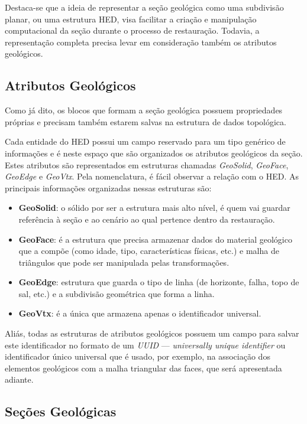 Destaca-se que a ideia de representar a seção geológica como uma subdivisão planar, ou uma estrutura HED, visa facilitar a criação e manipulação computacional da seção durante o processo de restauração. Todavia, a representação completa precisa levar em consideração também os atributos geológicos.

\subsection{Atributos Geológicos}

Como já dito, os blocos que formam a seção geológica possuem propriedades próprias e precisam também estarem salvas na estrutura de dados topológica.

Cada entidade do HED possui um campo reservado para um tipo genérico de informações e é neste espaço que são organizados os atributos geológicos da seção. Estes atributos são representados em estruturas chamadas \textit{GeoSolid}, \textit{GeoFace}, \textit{GeoEdge} e \textit{GeoVtx}. Pela nomenclatura, é fácil observar a relação com o HED. As principais informações organizadas nessas estruturas são:

\renewcommand{\labelitemi}{•}
\begin{itemize}
  \item \textbf{GeoSolid}: o sólido por ser a estrutura mais alto nível, é quem vai guardar referência à seção e ao cenário ao qual pertence dentro da restauração.
  \item \textbf{GeoFace}: é a estrutura que precisa armazenar dados do material geológico que a compõe (como idade, tipo, características físicas, etc.) e malha de triângulos que pode ser manipulada pelas transformações.
  \item \textbf{GeoEdge}: estrutura que guarda o tipo de linha (de horizonte, falha, topo de sal, etc.) e a subdivisão geométrica que forma a linha. 
  \item \textbf{GeoVtx}: é a única que armazena apenas o identificador universal.
\end{itemize}

Aliás, todas as estruturas de atributos geológicos possuem um campo para salvar este identificador no formato de um \textit{UUID} --- \textit{universally unique identifier} ou identificador único universal que é usado, por exemplo, na associação dos elementos geológicos com a malha triangular das faces, que será apresentada adiante.

\subsection{Seções Geológicas} %



